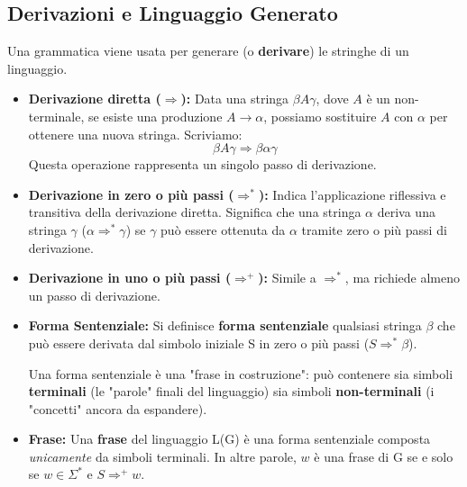 \documentclass[a4paper, 11pt]{article}
\begin{document}
\subsection{Derivazioni e Linguaggio Generato}
Una grammatica viene usata per generare (o \textbf{derivare}) le stringhe di un linguaggio.
\begin{itemize}
    \item \textbf{Derivazione diretta ($\Rightarrow$):} Data una stringa $\beta A \gamma$, dove $A$ è un non-terminale, se esiste una produzione $A \rightarrow \alpha$, possiamo sostituire $A$ con $\alpha$ per ottenere una nuova stringa. Scriviamo:
    \[ \beta A \gamma \Rightarrow \beta \alpha \gamma \]
   Questa operazione rappresenta un singolo passo di derivazione. 
    
    \item \textbf{Derivazione in zero o più passi ($\Rightarrow^*$):} Indica l'applicazione riflessiva e transitiva della derivazione diretta. Significa che una stringa $\alpha$ deriva una stringa $\gamma$ ($\alpha \Rightarrow^* \gamma$) se $\gamma$ può essere ottenuta da $\alpha$ tramite zero o più passi di derivazione. 
    
    \item \textbf{Derivazione in uno o più passi ($\Rightarrow^+$):} Simile a $\Rightarrow^*$, ma richiede almeno un passo di derivazione. 
    
    \item \textbf{Forma Sentenziale:} Si definisce \textbf{forma sentenziale} qualsiasi stringa $\beta$ che può essere derivata dal simbolo iniziale S in zero o più passi ($S \Rightarrow^* \beta$). 
    
    Una forma sentenziale è una "frase in costruzione": può contenere sia simboli \textbf{terminali} (le "parole" finali del linguaggio) sia simboli \textbf{non-terminali} (i "concetti" ancora da espandere).
    
    \item \textbf{Frase:} Una \textbf{frase} del linguaggio L(G) è una forma sentenziale composta \textit{unicamente} da simboli terminali. In altre parole, $w$ è una frase di G se e solo se $w \in \Sigma^*$ e $S \Rightarrow^+ w$.
\end{itemize}
\end{document}
